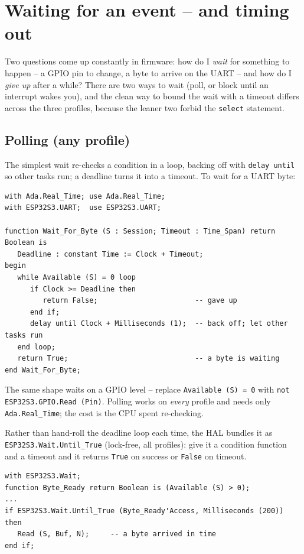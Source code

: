 \section{Waiting for an event -- and timing out}
\label{sec:waiting}

Two questions come up constantly in firmware: how do I \emph{wait} for something
to happen -- a GPIO pin to change, a byte to arrive on the UART -- and how do I
\emph{give up} after a while? There are two ways to wait (poll, or block until an
interrupt wakes you), and the clean way to bound the wait with a timeout differs
across the three profiles, because the leaner two forbid the \texttt{select}
statement.

\subsection{Polling (any profile)}

The simplest wait re-checks a condition in a loop, backing off with
\texttt{delay until} so other tasks run; a deadline turns it into a timeout. To
wait for a UART byte:

\begin{lstlisting}
with Ada.Real_Time; use Ada.Real_Time;
with ESP32S3.UART;  use ESP32S3.UART;

function Wait_For_Byte (S : Session; Timeout : Time_Span) return Boolean is
   Deadline : constant Time := Clock + Timeout;
begin
   while Available (S) = 0 loop
      if Clock >= Deadline then
         return False;                       -- gave up
      end if;
      delay until Clock + Milliseconds (1);  -- back off; let other tasks run
   end loop;
   return True;                              -- a byte is waiting
end Wait_For_Byte;
\end{lstlisting}

The same shape waits on a GPIO level -- replace \texttt{Available (S) = 0} with
\texttt{not ESP32S3.GPIO.Read (Pin)}. Polling works on \emph{every} profile and
needs only \texttt{Ada.Real\_Time}; the cost is the CPU spent re-checking.

Rather than hand-roll the deadline loop each time, the HAL bundles it as
\texttt{ESP32S3.Wait.Until\_True} (lock-free, all profiles): give it a condition
function and a timeout and it returns \texttt{True} on success or \texttt{False}
on timeout.

\begin{lstlisting}
with ESP32S3.Wait;
function Byte_Ready return Boolean is (Available (S) > 0);
...
if ESP32S3.Wait.Until_True (Byte_Ready'Access, Milliseconds (200)) then
   Read (S, Buf, N);     -- a byte arrived in time
end if;
\end{lstlisting}

